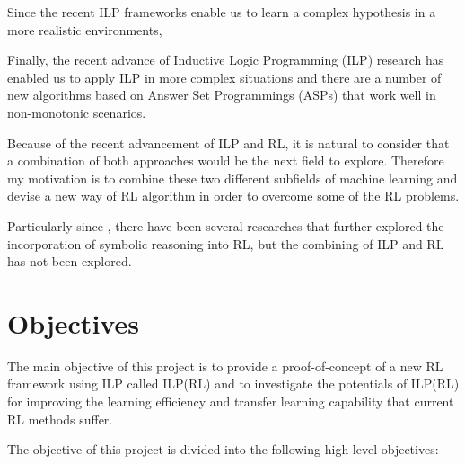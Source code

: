 Since the recent ILP frameworks enable us to learn a complex hypothesis in a more realistic environments, 

Finally, the recent advance of Inductive Logic Programming (ILP) research has enabled us to apply ILP in more complex situations and there are a number of new algorithms based on Answer Set Programmings (ASPs) that work well in non-monotonic scenarios.

Because of the recent advancement of ILP and RL, it is natural to consider that a combination of both approaches would be the next field to explore.
Therefore my motivation is to combine these two different subfields of machine learning and devise a new way of RL algorithm in order to overcome some of the RL problems.

Particularly since \cite{Garnelo2016}, there have been several researches that further explored the incorporation of symbolic reasoning into RL, but the combining of ILP and RL has not been explored. 

\section{Objectives}
\label{sec:objectives}

The main objective of this project is to provide a proof-of-concept of a new RL framework using ILP called ILP(RL) and to investigate the potentials of ILP(RL) for improving the learning efficiency and transfer learning capability that current RL methods suffer.

The objective of this project is divided into the following high-level objectives: 

